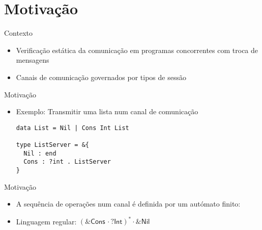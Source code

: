 \section{Motivação}
\lstset{language=CFST, numbers=none}

\begin{frame}[fragile]{Contexto}
  \begin{itemize}
  \item Verificação estática da comunicação em programas concorrentes com troca de mensagens
    \newline
  \item Canais de comunicação governados por tipos de sessão
  \end{itemize}
\end{frame}

\begin{frame}[fragile]{Motivação}

  \begin{itemize}
  \item Exemplo: Transmitir uma lista num canal de comunicação
    \newline
    
\begin{lstlisting}  
data List = Nil | Cons Int List

type ListServer = &{
  Nil : end
  Cons : ?int . ListServer
}
\end{lstlisting}
  \end{itemize}
\end{frame}


\begin{frame}{Motivação}
  \begin{itemize}
    \item A sequência de operações num canal é definida por um autómato finito:
      \newline
      
    \item Linguagem regular: $(\textsf{\&Cons}\,\cdot\textsf{?Int})^*\cdot\textsf{\&Nil}$
      
  \end{itemize}

\end{frame}

